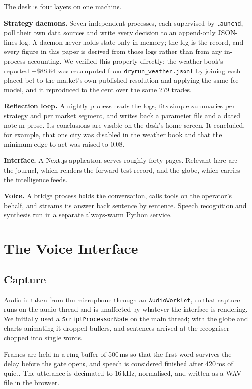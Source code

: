 \documentclass[conference]{IEEEtran}
\begin{document}
The desk is four layers on one machine.

\textbf{Strategy daemons.} Seven independent processes, each supervised by
\texttt{launchd}, poll their own data sources and write every decision to an
append-only JSON-lines log. A daemon never holds state only in memory; the log
is the record, and every figure in this paper is derived from those logs rather
than from any in-process accounting. We verified this property directly: the
weather book's reported $+\$88.84$ was recomputed from
\texttt{dryrun\_weather.jsonl} by joining each placed bet to the market's own
published resolution and applying the same fee model, and it reproduced to the
cent over the same 279 trades.

\textbf{Reflection loop.} A nightly process reads the logs, fits simple
summaries per strategy and per market segment, and writes back a parameter file
and a dated note in prose. Its conclusions are visible on the desk's home
screen. It concluded, for example, that one city was disabled in the weather book and that
the minimum edge to act was raised to 0.08.

\textbf{Interface.} A Next.js application serves roughly forty pages. Relevant
here are the journal, which renders the forward-test record, and the globe,
which carries the intelligence feeds.

\textbf{Voice.} A bridge process holds the conversation, calls tools on the
operator's behalf, and streams its answer back sentence by sentence. Speech
recognition and synthesis run in a separate always-warm Python service.

\section{The Voice Interface}
\label{sec:voice}

\subsection{Capture}
Audio is taken from the microphone through an \texttt{AudioWorklet}, so that
capture runs on the audio thread and is unaffected by whatever the interface is
rendering. We initially used a \texttt{ScriptProcessorNode} on the main thread;
with the globe and charts animating it dropped buffers, and sentences arrived
at the recogniser chopped into single words.

Frames are held in a ring buffer of 500\,ms so that the first word survives the
delay before the gate opens, and speech is considered finished after 420\,ms of
quiet. The utterance is decimated to 16\,kHz, normalised, and written as a WAV
file in the browser.
\end{document}
